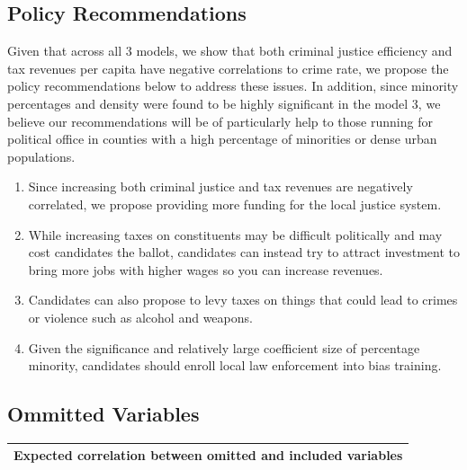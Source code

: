 \documentclass[]{article}
\begin{document}
\hypertarget{policy-recommendations}{%
\subsection{Policy Recommendations}\label{policy-recommendations}}

Given that across all 3 models, we show that both criminal justice
efficiency and tax revenues per capita have negative correlations to
crime rate, we propose the policy recommendations below to address these
issues. In addition, since minority percentages and density were found
to be highly significant in the model 3, we believe our recommendations
will be of particularly help to those running for political office in
counties with a high percentage of minorities or dense urban
populations.

\begin{enumerate}
\def\labelenumi{\arabic{enumi}.}
\item
  Since increasing both criminal justice and tax revenues are negatively
  correlated, we propose providing more funding for the local justice
  system.
\item
  While increasing taxes on constituents may be difficult politically
  and may cost candidates the ballot, candidates can instead try to
  attract investment to bring more jobs with higher wages so you can
  increase revenues.
\item
  Candidates can also propose to levy taxes on things that could lead to
  crimes or violence such as alcohol and weapons.
\item
  Given the significance and relatively large coefficient size of
  percentage minority, candidates should enroll local law enforcement
  into bias training.
\end{enumerate}

\hypertarget{ommitted-variables}{%
\subsection{Ommitted Variables}\label{ommitted-variables}}

\begin{longtable}[]{@{}l@{}}
\toprule
Expected correlation between omitted and included
variables\tabularnewline
\midrule
\endhead
\bottomrule
\end{longtable}
\end{document}
